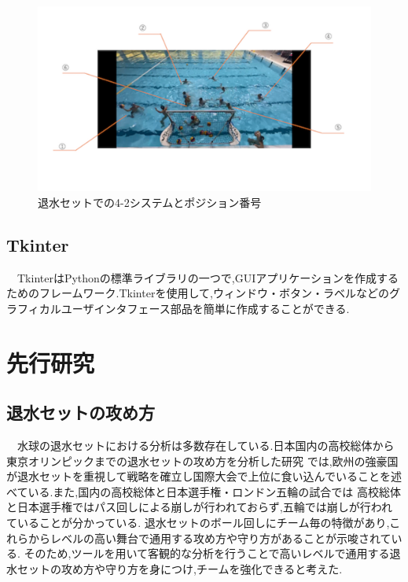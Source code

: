 \documentclass[../main.tex]{subfiles}
\begin{document}
\begin{figure}[ht]
    \begin{center}
        \includegraphics{img/01.png}
        \caption{退水セットでの4-2システムとポジション番号}
        \label{img:ExclusionNO}
    \end{center}
\end{figure}



\subsection{Tkinter}
\par　TkinterはPythonの標準ライブラリの一つで,GUIアプリケーションを作成するためのフレームワーク.Tkinterを使用して,ウィンドウ・ボタン・ラベルなどのグラフィカルユーザインタフェース部品を簡単に作成することができる.

\section{先行研究}
\subsection{退水セットの攻め方}
\par　水球の退水セットにおける分析は多数存在している.日本国内の高校総体から東京オリンピックまでの退水セットの攻め方を分析した研究\cite{weko_1697_1}
では,欧州の強豪国が退水セットを重視して戦略を確立し国際大会で上位に食い込んでいることを述べている.また,国内の高校総体と日本選手権・ロンドン五輪の試合では
高校総体と日本選手権ではパス回しによる崩しが行われておらず,五輪では崩しが行われていることが分かっている.\cite{洲雅明2016水球競技における退水時攻撃のディフェンスの崩しについて}
退水セットのボール回しにチーム毎の特徴があり,これらからレベルの高い舞台で通用する攻め方や守り方があることが示唆されている.
そのため,ツールを用いて客観的な分析を行うことで高いレベルで通用する退水セットの攻め方や守り方を身につけ,チームを強化できると考えた.
\end{document}

